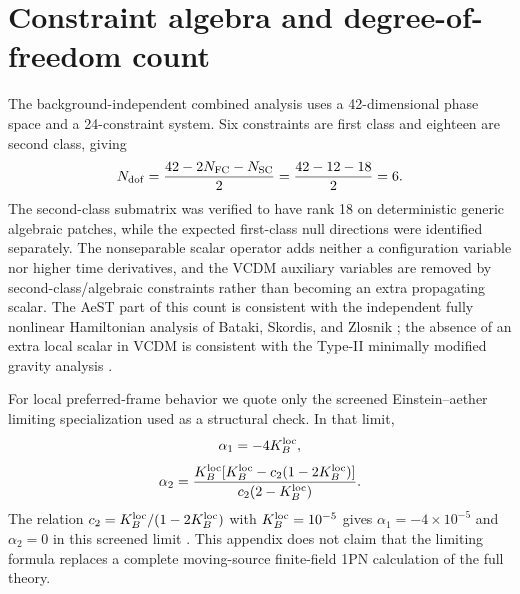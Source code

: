 \section{Constraint algebra and degree-of-freedom count}\label{app:dirac}
The background-independent combined analysis uses a 42-dimensional phase space and a 24-constraint system. Six constraints are first class and eighteen are second class, giving
\begin{equation}
N_{\rm dof}=\frac{42-2N_{\rm FC}-N_{\rm SC}}{2}
=\frac{42-12-18}{2}=6.
\end{equation}
The second-class submatrix was verified to have rank 18 on deterministic generic algebraic patches, while the expected first-class null directions were identified separately. The nonseparable scalar operator adds neither a configuration variable nor higher time derivatives, and the VCDM auxiliary variables are removed by second-class/algebraic constraints rather than becoming an extra propagating scalar. The AeST part of this count is consistent with the independent fully nonlinear Hamiltonian analysis of Bataki, Skordis, and Zlosnik \cite{BatakiSkordisZlosnik2024}; the absence of an extra local scalar in VCDM is consistent with the Type-II minimally modified gravity analysis \cite{DeFeliceMaedaMukohyamaPookkillath2022}.

For local preferred-frame behavior we quote only the screened Einstein--aether limiting specialization used as a structural check. In that limit,
\begin{equation}
\alpha_1=-4K_B^{\rm loc},
\end{equation}
\begin{equation}
\alpha_2=\frac{K_B^{\rm loc}[K_B^{\rm loc}-c_2(1-2K_B^{\rm loc})]}{c_2(2-K_B^{\rm loc})}.
\end{equation}
The relation $c_2=K_B^{\rm loc}/(1-2K_B^{\rm loc})$ with $K_B^{\rm loc}=10^{-5}$ gives $\alpha_1=-4\times10^{-5}$ and $\alpha_2=0$ in this screened limit \cite{FosterJacobson2006}. This appendix does not claim that the limiting formula replaces a complete moving-source finite-field 1PN calculation of the full theory.
